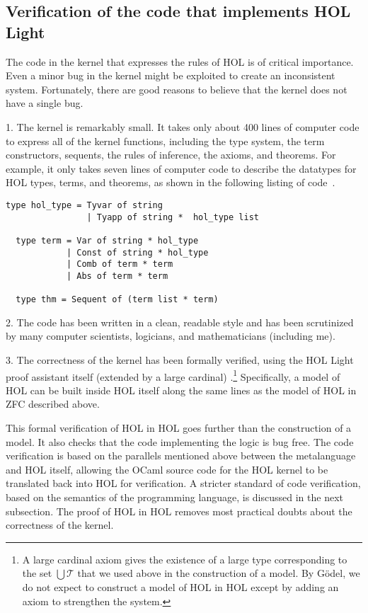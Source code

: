 \documentclass[brochure,english,12pt]{bourbaki}
\theoremstyle{plain}
\def\T{{\mathcal T}}
\begin{document}
\subsection{Verification of the code that implements HOL Light}

The code in the kernel that expresses the rules of HOL is of critical
importance.  Even a minor bug in the kernel might be exploited to
create an inconsistent system.  Fortunately, there are good reasons to
believe that the kernel does not have a single bug.

1.  The kernel is remarkably small.  It takes only about 400 lines of
computer code to express all of the kernel functions, including the
type system, the term constructors, sequents, the rules of inference,
the axioms, and theorems.  For example, it only takes seven lines of
computer code to describe the datatypes for HOL types, terms, and
theorems, as shown in the following listing of code~\cite{HOLL}.

\begin{lstlisting}[keepspaces=true,stringstyle=\tt,basicstyle=\small,frame=single,framesep=8pt,mathescape,morekeywords={type},columns=flexible]
  type hol_type = Tyvar of string
                | Tyapp of string *  hol_type list

  type term = Var of string * hol_type
            | Const of string * hol_type
            | Comb of term * term
            | Abs of term * term

  type thm = Sequent of (term list * term)
\end{lstlisting}

2.  The code has been written in a clean, readable style and has been
scrutinized by many computer scientists, logicians, and mathematicians
(including me).

3.  The correctness of the kernel has been formally verified, using
the HOL Light proof assistant itself (extended by a large cardinal)
\cite{HaSelf}.\footnote{A large cardinal axiom gives the existence of a large
  type corresponding to the set $\bigcup\T$ that we used above in the
  construction of a model.  By G\"odel, we do not expect to construct
  a model of HOL in HOL except by adding an axiom to strengthen the
  system.}  Specifically, a model of HOL can be built inside HOL
itself along the same lines as the model of HOL in ZFC described
above.

This formal verification of HOL in HOL goes further than the
construction of a model.  It also checks that the code implementing
the logic is bug free.  The code verification is based on the
parallels mentioned above between the metalanguage and HOL itself,
allowing the OCaml source code for the HOL kernel to be translated
back into HOL for verification.  A stricter standard of code
verification, based on the semantics of the programming language, is
discussed in the next subsection.  The proof of HOL in HOL removes
most practical doubts about the correctness of the kernel.
\end{document}
